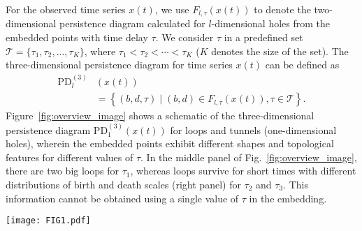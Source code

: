 \documentclass[twocolumn,pre,amsmath,amssymb]{revtex4-1}
\begin{document}
For the observed time series $x(t)$, we use $F_{l,\tau}(x(t))$ to denote the two-dimensional persistence diagram calculated for $l$-dimensional holes from the embedded points with time delay $\tau$.
We consider $\tau$ in a predefined set $\mathcal{T}=\{\tau_1,\tau_2,...,\tau_K\}$, where $\tau_1<\tau_2<\cdots<\tau_K$ ($K$ denotes the size of the set).
The three-dimensional persistence diagram for time series $x(t)$ can be defined as 
\begin{align}
    \text{PD}^{(3)}_{l}&(x(t))\nonumber\\
    &=\left \{(b,d,\tau)\mid (b,d) \in F_{l,\tau}(x(t)), \tau \in \mathcal{T}\right \}.
\end{align}
Figure~\ref{fig:overview_image} shows a schematic 
of the three-dimensional persistence diagram $\text{PD}^{(3)}_{1}(x(t))$ for loops and tunnels (one-dimensional holes), wherein the embedded points exhibit different shapes and topological features for different values of $\tau$.
In the middle panel of Fig.~\ref{fig:overview_image},
there are two big loops for $\tau_1$, whereas loops survive for short times with 
different distributions of birth and death scales (right panel) for $\tau_2$ and $\tau_3$.
This information cannot be obtained using a single value of $\tau$ in the embedding. 
\begin{figure*}
	\texttt{[image: FIG1.pdf]}
	\protect\caption{Time series $x(t)$ is 
		embedded in an $m$-dimensional space (in this illustration, $m=3$) through delay embedding (left panel). 
		The embedded points at different values of time delay $\tau$ have different geometric features,
        such as clusters and loops (middle panel). 
		We extract the topological features such as the emergence (birth scale) and disappearance (death scale) of these geometric features.
		The birth and death scales at each $\tau$ are represented as points in a two-dimensional persistence diagram. 
		By observing the manner in which the topological features vary with $\tau$ serving as an additional dimension, 
		we obtain the three-dimensional persistence diagram (right panel),
		which can be considered to be a typical feature of the time series.
		\label{fig:overview_image}}
\end{figure*}
\end{document}
